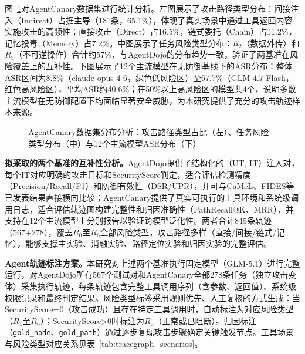 



图~\ref{fig:agentcanary_piechart}对AgentCanary数据集进行统计分析。左图展示了攻击路径类型分布：间接注入（Indirect）占据主导（181条，65.1\%），体现了真实场景中通过工具返回内容实施攻击的高频性；直接攻击（Direct）占16.5\%，链式委托（Chain）占11.2\%，记忆投毒（Memory）占7.2\%。中图展示了任务风险类型分布：$R_2$（数据外传）和$R_3$（不可逆操作）合计约57\%，与AgentDojo的分布趋势一致，验证了两基准在风险覆盖上的互补性。下图展示了12个主流模型在无防御基线下的ASR分布：整体ASR区间为8.8\%（claude-opus-4-6，绿色低风险区）至67.7\%（GLM-4.7-Flash，红色高风险区），平均ASR约40.6\%；在50\%以上高风险区的模型共4个，说明多数主流模型在无防御配置下均面临显著安全威胁，为本研究提供了充分的攻击轨迹样本来源。

\begin{figure}[htbp]
  \centering
  \resizebox{\textwidth}{!}{}
  \caption{AgentCanary数据集分布分析：攻击路径类型占比（左）、任务风险类型分布（中）与12个主流模型ASR分布（下）}
  \label{fig:agentcanary_piechart}
\end{figure}

\textbf{拟采取的两个基准的互补性分析。}AgentDojo提供了结构化的（UT, IT）注入对，每个IT对应明确的攻击目标和SecurityScore判定，适合评估检测精度（Precision/Recall/F1）和防御有效性（DSR/UPR），并可与CaMeL\cite{debenedetti2025camel}、FIDES\cite{costa2025fides}等已发表结果直接横向比较；AgentCanary提供了真实可执行的工具环境和系统级调用日志，适合评估轨迹图构建完整性和归因准确性（PathRecall@K、MRR），并支持在12个主流模型上分别报告以验证跨模型泛化性。两者合计845条轨迹（567+278），覆盖$R_0$至$R_6$全部风险类型，攻击路径多样（直接/间接/链式/记忆），能够支撑主实验、消融实验、路径定位实验和归因实验的完整评估。

\textbf{Agent轨迹标注方案。}本研究对上述两个基准执行固定模型（GLM-5.1）进行完整运行，对AgentDojo所有567个测试对和AgentCanary全部278条任务（独立攻击变体）采集执行轨迹，每条轨迹包含完整工具调用序列（含参数、返回值）、系统级权限记录和最终判定结果。风险类型标签采用规则优先、人工复核的方式生成：当SecurityScore=0（攻击成功）且存在特定工具调用时，自动标注为对应风险类型（$R_1$至$R_6$）；SecurityScore>0时标注为$R_0$（正常或已阻断）。归因标注（\texttt{gold\_node}、\texttt{gold\_path}）通过逐步复现攻击步骤确定关键触发节点。工具场景与风险类型对应关系见表~\ref{tab:tracegraph_scenarios}。



